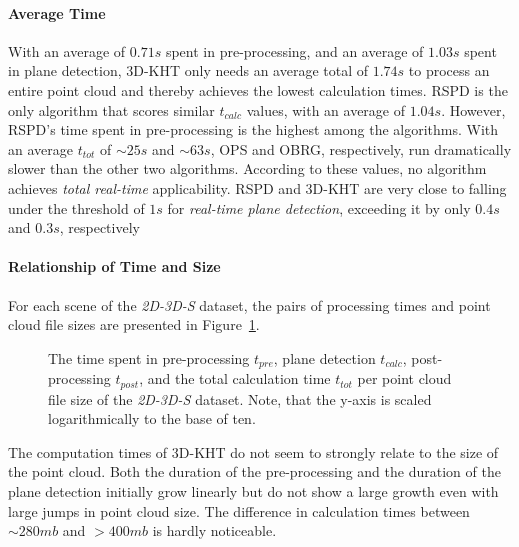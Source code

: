 \documentclass[main.tex]{subfiles}
\begin{document}
\paragraph{Average Time }
\label{par:2D-3D-S-time}
With an average of $0.71s$ spent in pre-processing, and an average of $1.03s$ spent in plane detection,
3D-KHT only needs an average total of $1.74s$ to process an entire point cloud and thereby achieves the lowest calculation times.
RSPD is the only algorithm that scores similar $t_{calc}$ values, with an
average of $1.04s$. However, RSPD's time spent in pre-processing is the highest among the algorithms.
With an average $t_{tot}$ of ${\sim}25s$ and ${\sim}63s$, OPS and OBRG, respectively, run dramatically slower than the other two algorithms.
According to these values, no algorithm achieves \textit{total real-time} applicability. RSPD and 3D-KHT are very close
to falling under the threshold of $1s$ for \textit{real-time plane detection}, exceeding it by only $0.4s$ and $0.3s$, respectively


\paragraph{Relationship of Time and Size}
For each scene of the \textit{2D-3D-S} dataset, the pairs of processing times and point cloud file sizes are presented in Figure~\ref{fig:sizetimestanford}.

\begin{figure}[]
    \centering
    \def\svgwidth{0.9\textwidth}
    
    \caption[Time per Cloud size 2D-3D-S]{The time spent in pre-processing $t_{pre}$, plane detection $t_{calc}$,
        post-processing $t_{post}$, and the total calculation time $t_{tot}$ per point cloud file size of the \textit{2D-3D-S} dataset.
        Note, that the y-axis is scaled logarithmically to the base of ten.}
    \label{fig:sizetimestanford}
\end{figure}
The computation times of 3D-KHT do not seem to strongly relate to the size of the point cloud.
Both the duration of the pre-processing and the duration of the plane detection initially grow linearly
but do not show a large growth even with large jumps in point cloud size.
The difference in calculation times between ${\sim}280mb$ and ${>}400mb$ is hardly noticeable.
\end{document}
